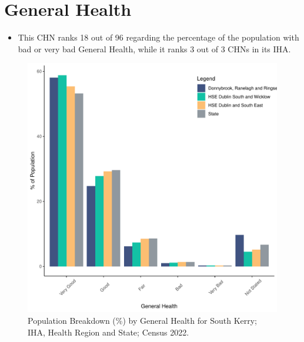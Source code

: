 \documentclass{article}
\begin{document}
\pagebreak

\section{General Health}\label{sect:GenHealth}
\begin{itemize}
\item  This CHN ranks  18 out of 96 regarding the percentage of the population with bad or very bad General Health, while it ranks   3 out of 3 CHNs in its IHA.
\end{itemize}
\begin{figure}[h]
	\centering
	\includegraphics[width = 150mm]{../figures/GenED.pdf}
	\caption{Population Breakdown (\%) by General Health for South Kerry; IHA, Health Region and State;  Census 2022.}
	\label{fig:2ae19629-1a6a-13a3-e055-000000000001}
	\end{figure}
\end{document}
